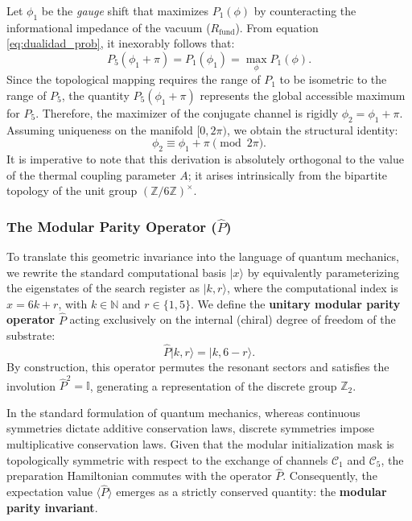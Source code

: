\documentclass[reprint,aps,pra,superscriptaddress,nofootinbib]{revtex4-2}
\theoremstyle{plain}
\theoremstyle{definition}
\theoremstyle{remark}
\begin{document}
Let $\phi_1$ be the \textit{gauge} shift that maximizes $P_1(\phi)$ by counteracting the informational impedance of the vacuum ($R_{\text{fund}}$). From equation \eqref{eq:dualidad_prob}, it inexorably follows that:
\begin{equation}
P_5(\phi_1+\pi) = P_1(\phi_1) = \max_{\phi} P_1(\phi).
\end{equation}
Since the topological mapping requires the range of $P_1$ to be isometric to the range of $P_5$, the quantity $P_5(\phi_1+\pi)$ represents the global accessible maximum for $P_5$. Therefore, the maximizer of the conjugate channel is rigidly $\phi_2 = \phi_1 + \pi$. Assuming uniqueness on the manifold $[0, 2\pi)$, we obtain the structural identity:
\begin{equation}
\phi_2 \equiv \phi_1 + \pi \pmod{2\pi}.
\label{eq:relacion_fases}
\end{equation}
It is imperative to note that this derivation is absolutely orthogonal to the value of the thermal coupling parameter $A$; it arises intrinsically from the bipartite topology of the unit group $(\mathbb{Z}/6\mathbb{Z})^{\times}$.

\subsubsection*{The Modular Parity Operator ($\hat{P}$)}

To translate this geometric invariance into the language of quantum mechanics, we rewrite the standard computational basis $|x\rangle$ by equivalently parameterizing the eigenstates of the search register as $|k, r\rangle$, where the computational index is $x = 6k + r$, with $k \in \mathbb{N}$ and $r \in \{1, 5\}$. We define the \textbf{unitary modular parity operator} $\hat{P}$ acting exclusively on the internal (chiral) degree of freedom of the substrate:
\begin{equation}
\hat{P} |k, r\rangle = |k, 6-r\rangle.
\end{equation}
By construction, this operator permutes the resonant sectors and satisfies the involution $\hat{P}^2 = \mathbb{I}$, generating a representation of the discrete group $\mathbb{Z}_2$. 

In the standard formulation of quantum mechanics, whereas continuous symmetries dictate additive conservation laws, discrete symmetries impose multiplicative conservation laws. Given that the modular initialization mask is topologically symmetric with respect to the exchange of channels $\mathcal{C}_1$ and $\mathcal{C}_5$, the preparation Hamiltonian commutes with the operator $\hat{P}$. Consequently, the expectation value $\langle \hat{P} \rangle$ emerges as a strictly conserved quantity: the \textbf{modular parity invariant}.
\end{document}
